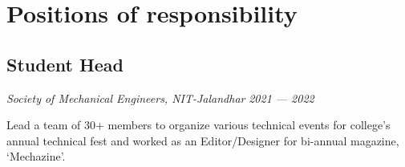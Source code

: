 \documentclass[a4paper]{article}
\begin{document}
\section{Positions of responsibility}
\subsection{Student Head}
\textit{Society of Mechanical Engineers, NIT-Jalandhar}
\hfill
\textit{2021 --- 2022}

Lead a team of 30+ members to organize various technical events for college's annual technical fest and worked as an Editor/Designer for bi-annual magazine, `Mechazine'.
\end{document}
